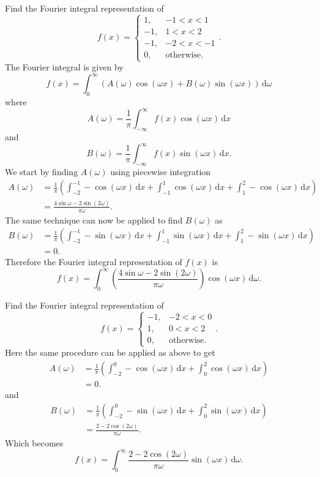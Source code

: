 Find the Fourier integral representation of
\[ 
f(x) = \begin{cases}
  1, & -1 < x < 1 \\
  -1, & 1 < x < 2 \\
  -1, & -2 < x < -1 \\
   0, & \text{otherwise}
.\end{cases}
.\]
\bigbreak
The Fourier integral is given by
\[ 
f(x) = \int_{0}^{\infty} \left( A (\omega) \cos (\omega x) + B(\omega) \sin(\omega x) \right) \, \mathrm{d}\omega
\]
where
\[ 
A (\omega) = \frac{1}{\pi} \int_{-\infty}^{\infty} f(x) \cos(\omega x) \, \mathrm{d}x 
\]
and
\[ 
B(\omega) = \frac{1}{\pi} \int_{-\infty}^{\infty} f(x) \sin \left( \omega x \right) \, \mathrm{d}x 
.\]
We start by finding $A(\omega)$ using piecewise integration
\begin{align*}
  A(\omega) &= \frac{1}{\pi} \left( \int_{-2}^{-1} - \cos \left( \omega x \right) \, \mathrm{d}x  + \int_{-1}^{1} \cos (\omega x) \, \mathrm{d}x + \int_{1}^{2} - \cos(\omega x) \, \mathrm{d}x \right) \\
            &= \frac{4 \sin \omega - 2 \sin (2\omega)}{\pi \omega}
.\end{align*}
The same technique can now be applied to find $B (\omega)$ as
\begin{align*}
  B(\omega) &= \frac{1}{\pi} \left( \int_{-2}^{-1} - \sin (\omega x) \, \mathrm{d}x  + \int_{-1}^{1} \sin (\omega x) \, \mathrm{d}x  + \int_{1}^{2} - \sin(\omega x) \, \mathrm{d}x  \right) \\
            &= 0
.\end{align*}
Therefore the Fourier integral representation of $f(x)$ is
\[ 
f(x) = \int_{0}^{\infty} \left( \frac{4 \sin \omega - 2 \sin (2\omega)}{\pi \omega} \right) \cos (\omega x) \, \mathrm{d}\omega
.\]

Find the Fourier integral representation of
\[ 
f(x) = \begin{cases}
-1, & -2 < x < 0\\
1,  & 0 < x < 2 \\
0, & \text{otherwise}
.\end{cases}
.\]
\bigbreak
Here the same procedure can be applied as above to get
\begin{align*}
  A(\omega) &= \frac{1}{\pi} \left( \int_{-2}^{0} - \cos(\omega x) \, \mathrm{d}x  + \int_{0}^{2} \cos (\omega x) \, \mathrm{d}x  \right) \\
            &= 0
.\end{align*}
and
\begin{align*}
  B(\omega) &= \frac{1}{\pi} \left( \int_{-2}^{0} - \sin(\omega x) \, \mathrm{d}x  + \int_{0}^{2} \sin (\omega x) \, \mathrm{d}x  \right) \\
            &= \frac{2 - 2 \cos (2\omega)}{\pi \omega}
.\end{align*}
Which becomes
\[ 
f(x) = \int_{0}^{\infty} \frac{2 - 2 \cos (2\omega)}{\pi \omega} \sin (\omega x) \, \mathrm{d}\omega
.\]


